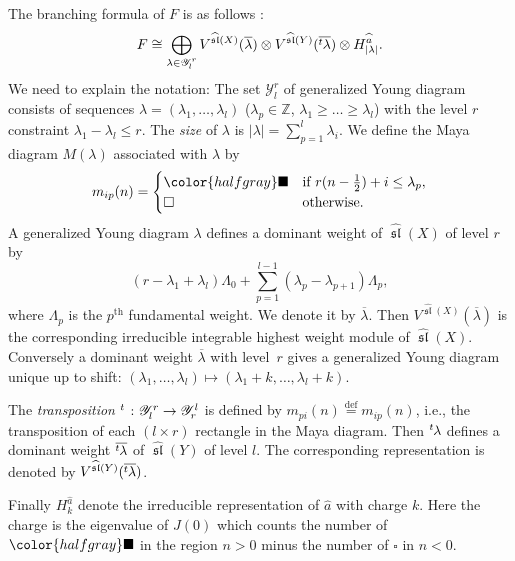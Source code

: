 \documentclass[pdftex]{sigma}
\theoremstyle{definition}
\numberwithin{equation}{section}
\newcommand{\lsp}[2]{{\mskip-.3mu}{}^{#1}\mskip-1mu{#2}}
\newcommand{\defeq}{\overset{\operatorname{\scriptstyle def}}{=}}
\newcommand{\Z}{{\mathbb Z}}
\newcommand{\algsl}{\operatorname{\mathfrak{sl}}} %
\newcommand{\graysquare}{\color{halfgray}\blacksquare}
\begin{document}
The branching formula of $F$ is as follows \cite{Hasegawa}:
\begin{equation}\label{eq:branch}
   F \cong
   \bigoplus_{\substack{\lambda\in\mathscr Y^r_l}}
   V^{\widehat{\algsl}(X)}(\overline\lambda)
   \otimes V^{\widehat{\algsl}(Y)}(\overline{\lsp{t}\lambda})
   \otimes H^{\widehat{a}}_{|\lambda|}.
\end{equation}
We need to explain the notation: The set $\mathscr Y^r_l$ of
generalized Young diagram consists of sequences $\lambda =
(\lambda_1,\dots,\lambda_l)$ ($\lambda_p\in\Z$, $\lambda_1\ge\dots\ge
\lambda_l$) with the level $r$ constraint $\lambda_1 - \lambda_l \le
r$. The {\it size\/} of $\lambda$ is $|\lambda| = \sum_{p=1}^l
\lambda_i$.
%
We def\/ine the Maya diagram $M(\lambda)$ associated with $\lambda$ by
\begin{equation*}
  m_{ip}(n) =
  \begin{cases}
   \graysquare
    & \text{if $r(n-\frac12) + i \le \lambda_p$}, \\
    \square
    & \text{otherwise}.
  \end{cases}
\end{equation*}
A generalized Young diagram $\lambda$ def\/ines a dominant weight of
$\widehat{\algsl}(X)$ of level $r$ by
\begin{equation*}
   (r - \lambda_1 + \lambda_l) \Lambda_0
   + \sum_{p=1}^{l-1} (\lambda_p - \lambda_{p+1}) \Lambda_p,
\end{equation*}
where $\Lambda_p$ is the $p^{\mathrm{th}}$ fundamental weight. We
denote it by $\overline{\lambda}$.
Then $V^{\widehat{\algsl}(X)}(\overline\lambda)$ is the corresponding
irreducible integrable highest weight module of $\widehat{\algsl}(X)$.
Conversely a dominant weight $\overline{\lambda}$ with level~$r$ gives a generalized Young diagram unique up to shift:
$(\lambda_1,\dots,\lambda_l)\mapsto (\lambda_1+k,\dots,\lambda_l+k)$.

The {\it transposition \/} $\lsp{t}{\ }\colon \mathscr Y^r_l\to
\mathscr Y^l_r$ is def\/ined by $m_{pi}(n) \defeq m_{ip}(n)$, i.e., the
transposition of each $(l\times r)$ rectangle in the Maya diagram.
Then $\lsp{t}\lambda$ def\/ines a dominant weight
$\overline{\lsp{t}\lambda}$ of $\widehat{\algsl}(Y)$ of level $l$. The
corresponding representation is denoted by
$V^{\widehat{\algsl}(Y)}(\overline{\lsp{t}\lambda})$.

Finally $H^{\widehat{a}}_k$ denote the irreducible representation of
$\widehat{a}$ with charge $k$. Here the charge is the eigenvalue of
$J(0)$ which counts the number of $\graysquare$ in the
region $n > 0$ minus the number of $\square$ in $n < 0$.
\end{document}
